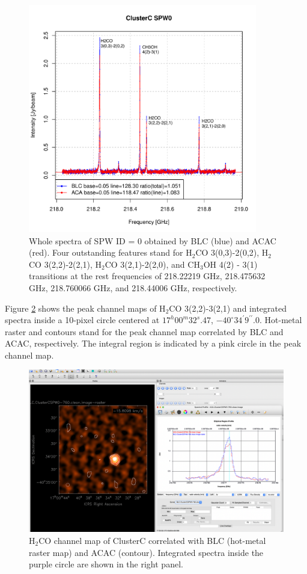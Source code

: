 \documentclass[a4paper, 10pt]{scrartcl}
\begin{document}
\begin{figure}[h]
	\centering
	\includegraphics[width=10cm]{ClusterC.SPW0.pdf}
	\caption{Whole spectra of SPW ID = 0 obtained by BLC (blue) and ACAC (red). Four outstanding features stand for H$_2$CO 3(0,3)-2(0,2), H$_2$CO 3(2,2)-2(2,1), H$_2$CO 3(2,1)-2(2,0), and CH$_3$OH 4(2) - 3(1) transitions at the rest frequencies of 218.22219 GHz, 218.475632 GHz, 218.760066 GHz, and 218.44006 GHz, respectively.}\label{fig:SPW0}
\end{figure}

Figure \ref{fig:H2COimageSpec} shows the peak channel maps of H$_2$CO 3(2,2)-3(2,1) and integrated spectra inside a 10-pixel circle centered at $17^h 00^m 32^s.47$, $-40^{\circ} 34^{\prime} 9^{\prime \prime}.0$.
Hot-metal raster and contours stand for the peak channel map correlated by BLC and ACAC, respectively.
The integral region is indicated by a pink circle in the peak channel map.

\begin{figure}[h]
	\centering
	\includegraphics[width=12cm]{ClusterC-SPW0.png}
	\caption{H$_2$CO channel map of ClusterC correlated with BLC (hot-metal raster map) and ACAC (contour). Integrated spectra inside the purple circle are shown in the right panel.}\label{fig:H2COimageSpec}
\end{figure}
\end{document}

